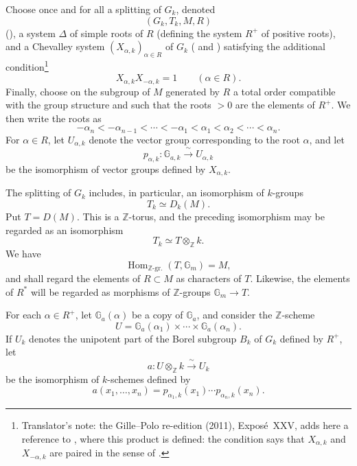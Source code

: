 

Choose once and for all a splitting of \(G_k\), denoted
\[
  (G_k,T_k,M,R)
\]
(), a system \(\Delta\) of simple roots of \(R\)
(defining the system \(R^+\) of positive roots), and a Chevalley system
\((X_{\alpha,k})_{\alpha\in R}\) of \(G_k\) ( and )
satisfying the additional condition\footnote{Translator's note: the Gille--Polo re-edition (2011), Exposé~XXV, adds here
a reference to , where this product is defined: the
condition says that \(X_{\alpha,k}\) and \(X_{-\alpha,k}\) are paired in the
sense of .}
\[
  X_{\alpha,k}X_{-\alpha,k}=1\qquad(\alpha\in R).
\]
Finally, choose on the subgroup of \(M\) generated by \(R\) a total order
compatible with the group structure and such that the roots \(>0\) are the
elements of \(R^+\). We then write the roots as
\[
 -\alpha_n<-\alpha_{n-1}<\cdots<-\alpha_1
 <\alpha_1<\alpha_2<\cdots<\alpha_n.
\]
For \(\alpha\in R\), let \(U_{\alpha,k}\) denote the vector group
corresponding to the root \(\alpha\), and let
\[
 p_{\alpha,k}\colon\mathbb G_{a,k}\xrightarrow{\ \sim\ }U_{\alpha,k}
\]
be the isomorphism of vector groups defined by \(X_{\alpha,k}\).


The splitting of \(G_k\) includes, in particular, an isomorphism of
\(k\)-groups
\[
 T_k\simeq D_k(M).
\]
Put \(T=D(M)\). This is a \(\mathbb Z\)-torus, and the preceding isomorphism
may be regarded as an isomorphism
\[
 T_k\simeq T\otimes_{\mathbb Z}k.
\]
We have
\[
 \operatorname{Hom}_{\mathbb Z\text{-gr.}}(T,\mathbb G_m)=M,
\]
and shall regard the elements of \(R\subset M\) as characters of \(T\).
Likewise, the elements of \(R^\ast\) will be regarded as morphisms of
\(\mathbb Z\)-groups \(\mathbb G_m\to T\).


For each \(\alpha\in R^+\), let \(\mathbb G_a(\alpha)\) be a copy of
\(\mathbb G_a\), and consider the \(\mathbb Z\)-scheme
\[
 U=\mathbb G_a(\alpha_1)\times\cdots\times\mathbb G_a(\alpha_n).
\]
If \(U_k\) denotes the unipotent part of the Borel subgroup \(B_k\) of
\(G_k\) defined by \(R^+\), let
\[
 a\colon U\otimes_{\mathbb Z}k\xrightarrow{\ \sim\ }U_k
\]
be the isomorphism of \(k\)-schemes defined by
\[
 a(x_1,\ldots,x_n)
 =p_{\alpha_1,k}(x_1)\cdots p_{\alpha_n,k}(x_n).
\]

